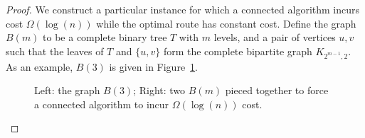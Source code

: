 \documentclass[english]{llncs}
\begin{document}
\begin{proof}

We construct a particular instance for which a connected algorithm incurs cost
$\Omega(\log(n))$ while the optimal route has constant cost. Define the graph
$B(m)$ to be a complete binary tree $T$ with $m$ levels, and a pair of vertices
$u,v$ such that the leaves of $T$ and $\{u,v\}$ form the complete bipartite
graph $K_{2^{m-1}, 2}$. As an example, $B(3)$ is given in Figure~\ref{fig:b3}.

\begin{figure}[th]
\centering
\begin{subfigure}{.5\textwidth}
  \centering
\end{subfigure}%
\begin{subfigure}{.5\textwidth}
  \centering
\end{subfigure}
\caption{Left: the graph $B(3)$; Right: two $B(m)$ pieced together to force a
connected algorithm to incur $\Omega(\log(n))$ cost.}
\label{fig:b3}
\end{figure}


\end{proof}
\end{document}
